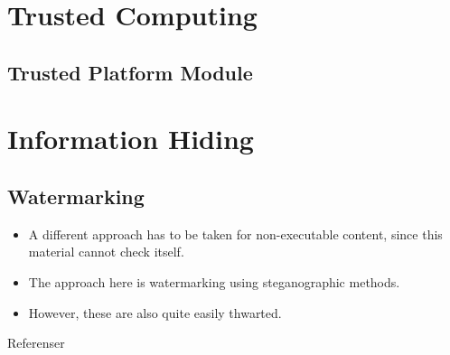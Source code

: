 \documentclass{beamer}
\begin{document}
\section{Trusted Computing}

\subsection{Trusted Platform Module}

\begin{frame}{\insertsubsectionhead}
\end{frame}


\section{Information Hiding}

\subsection{Watermarking}

\begin{frame}{\insertsubsectionhead}
  \begin{itemize}
    \item A different approach has to be taken for non-executable content, 
      since this material cannot check itself.

    \item The approach here is watermarking using steganographic methods.

    \item However, these are also quite easily thwarted.
  \end{itemize}
\end{frame}




\begin{frame}{Referenser}
  \small
  \printbibliography{}
\end{frame}
\end{document}
